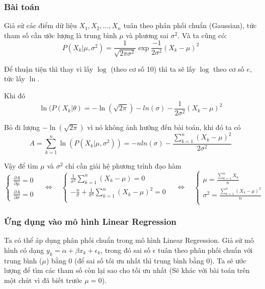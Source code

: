 \documentclass[12pt]{article}
\begin{document}
{\subsubsection{Bài toán}
{\fontsize{13}{16}\selectfont
\setlength{\parskip}{0.3cm}
Giả sử các điểm dữ liệu $X_1, X_2,...,X_n$ tuân theo phân phối chuẩn (Gaussian), tức tham số cần ước lượng là trung bình $\mu$ và phương sai $\sigma^2$. Và ta cũng có:
$$P(X_k|\mu, \sigma^2) = \frac{1}{\sqrt{2\pi\sigma^2}}\exp{\frac{-1}{2\sigma^2}(X_k-\mu)^2}$$

\noindent Để thuận tiện thì thay vì lấy $\log$ (theo cơ số 10) thì ta sẽ lấy $\log$ theo cơ số $e$, tức lấy $\ln$.

\noindent Khi đó
$$\ln(P(X_k|\theta) = -\ln{(\sqrt{2\pi})}-ln{(\sigma)} - \frac{1}{2\sigma^2}(X_k-\mu)^2$$

\noindent Bỏ đi lượng $-\ln{(\sqrt{2\pi})}$ vì nó không ảnh hưởng đến bài toán, khi đó ta có
$$A=\sum_{k = 1}^{n}\ln(P(X_k|\mu, \sigma^2)) = -nln{(\sigma)} - \frac{\sum_{k = 1}^{n}(X_k-\mu)^2}{2\sigma^2}$$

\noindent Vậy để tìm $\mu$ và $\sigma^2$ chỉ cần giải hệ phương trình đạo hàm
\setlength{\jot}{10pt}
\[
\begin{cases}
     \frac{\partial A}{\partial\mu} = 0\\
     \frac{\partial A}{\partial\sigma} = 0
\end{cases}
\quad \Leftrightarrow \quad
\begin{cases}
\frac{1}{\sigma^2}\sum_{k = 1}^{n}(X_k-\mu) = 0 \\
-\frac{n}{\sigma} + \frac{1}{\sigma^3}\sum_{k = 1}^{n}(X_k-\mu)^2 = 0 \\
\end{cases}
\quad \Leftrightarrow \quad
\begin{cases}
\mu =  \frac{\sum_{k = 1}^{n}X_k}{n}\\
\sigma^2 =  \frac{\sum_{k = 1}^{n}(X_k-\mu)^2}{n}\\
\end{cases}
\]
\subsubsection{Ứng dụng vào mô hình Linear Regression}
\noindent Ta có thể áp dụng phân phối chuẩn trong mô hình Linear Regression. Giả sử mô hình có dạng $y_k = \alpha + \beta x_k + \epsilon_k$, trong đó sai số $\epsilon$ tuân theo phân phối chuẩn với trung bình ($\mu$) bằng 0 (để sai số tối ưu nhất thì trung bình bằng 0). Ta sẽ ước lượng để tìm các tham số còn lại sao cho tối ưu nhất (Sẽ khác với bài toán trên một chút vì đã biết trước $\mu = 0$).

}}
\end{document}

